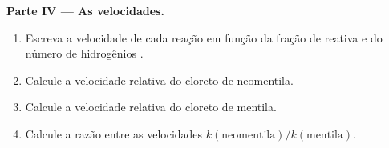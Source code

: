 \begin{problem}
\medskip
\noindent\textbf{Parte IV --- As velocidades.}
\begin{enumerate}[resume]
  \item Escreva a velocidade de cada reação em função da fração de
         reativa e do número de hidrogênios .
  \item Calcule a velocidade relativa do cloreto de neomentila.
  \item Calcule a velocidade relativa do cloreto de mentila.
  \item Calcule a razão entre as velocidades $k(\text{neomentila})/k(\text{mentila})$.
\end{enumerate}
\end{problem}
